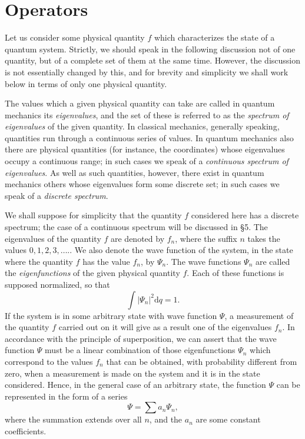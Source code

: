 \section{Operators}\label{Operators}
Let us consider some physical quantity $ f $ which characterizes the state of a quantum system. Strictly, we should speak in the following discussion not of one quantity, but of a complete set of them at the same time. However, the discussion is not essentially changed by this, and for brevity and simplicity we shall work below in terms of only one physical quantity.

The values which a given physical quantity can take are called in quantum mechanics its \textit{eigenvalues}, and the set of these is referred to as the \textit{spectrum of eigenvalues} of the given quantity. In classical mechanics, generally speaking, quantities run through a continuous series of values. In quantum mechanics also there are physical quantities (for instance, the coordinates) whose eigenvalues occupy a continuous range; in such cases we speak of a \textit{continuous spectrum of eigenvalues}. As well as such quantities, however, there exist in quantum mechanics others whose eigenvalues form some discrete set; in such cases we speak of a \textit{discrete spectrum}.

We shall suppose for simplicity that the quantity $ f $ considered here has a discrete spectrum; the case of a continuous spectrum will be discussed in §5. The eigenvalues of the quantity $ f $ are denoted by $ f_n $, where the suffix $ n $ takes the values $ 0,1,2,3,\dots. $. We also denote the wave function of the system, in the state where the quantity $ f $ has the value $ f_n $, by $ \Psi_n $. The wave functions $ \Psi_n $ are called the \textit{eigenfunctions} of the given physical quantity $ f $. Each of these functions is supposed normalized, so that
\begin{equation}\label{3.1}
\int|\Psi_n|^2\mathrm{d}q=1.
\end{equation}
If the system is in some arbitrary state with wave function $ \Psi $, a measurement of the quantity $ f $ carried out on it will give as a result one of the eigenvalues $ f_n $. In accordance with the principle of superposition, we can assert that the wave function $ \Psi $ must be a linear combination of those eigenfunctions $ \Psi_n $ which correspond to the values $ f_n $ that can be obtained, with probability different from zero, when a measurement is made on the system and it is in the state considered. Hence, in the general case of an arbitrary state, the function $ \Psi $ can be represented in the form of a series
\begin{equation}\label{3.2}
\Psi=\sum a_n\Psi_n,
\end{equation}
where the summation extends over all $ n $, and the $ a_n $ are some constant coefficients.

